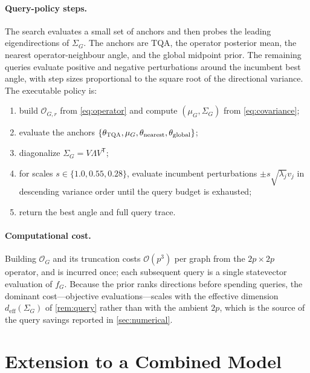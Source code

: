 \documentclass[aps,prresearch,reprint,amsmath,amssymb,floatfix,nofootinbib,superscriptaddress,longbibliography]{revtex4-2}
\theoremstyle{remark}
\newcommand{\TQA}{\textnormal{\textsc{TQA}}}
\newcommand{\calO}{\mathcal{O}}
\begin{document}
\paragraph{Query-policy steps.}
The search evaluates a small set of anchors and then probes the leading
eigendirections of \(\Sigma_G\).  The anchors are \TQA{}, the operator posterior
mean, the nearest operator-neighbour angle, and the global midpoint prior.  The
remaining queries evaluate positive and negative perturbations around the
incumbent best angle, with step sizes proportional to the square root of the
directional variance.  The executable policy is:
\begin{enumerate}
    \item build \(\calO_{G,r}\) from \cref{eq:operator} and compute
    \((\mu_G,\Sigma_G)\) from \cref{eq:covariance};
    \item evaluate the anchors
    \(\{\theta_{\TQA},\mu_G,\theta_{\mathrm{nearest}},\theta_{\mathrm{global}}\}\);
    \item diagonalize \(\Sigma_G=V\Lambda V^{\mathsf T}\);
    \item for scales \(s\in\{1.0,0.55,0.28\}\), evaluate incumbent perturbations
    \(\pm s\sqrt{\lambda_j}v_j\) in descending variance order until the query
    budget is exhausted;
    \item return the best angle and full query trace.
\end{enumerate}

\paragraph{Computational cost.}
Building \(\calO_G\) and its truncation costs \(\mathcal O(p^3)\) per graph from
the \(2p\times2p\) operator, and is incurred once; each subsequent query is a
single statevector evaluation of \(f_G\).  Because the prior ranks directions
before spending queries, the dominant cost---objective evaluations---scales with
the effective dimension \(d_{\mathrm{eff}}(\Sigma_G)\) of \cref{rem:query} rather
than with the ambient \(2p\), which is the source of the query savings reported in
\cref{sec:numerical}.

\section{Extension to a Combined Model}
\label{sec:combined}
\end{document}

